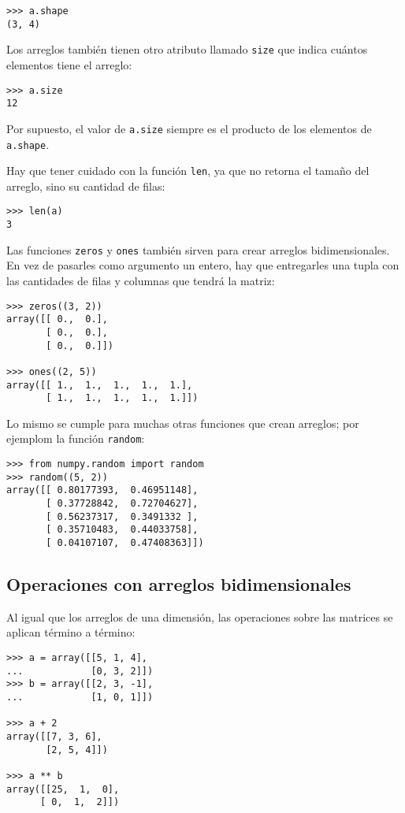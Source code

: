 \begin{lstlisting}
>>> a.shape
(3, 4)
\end{lstlisting}

Los arreglos también tienen otro atributo llamado \lstinline!size! que
indica cuántos elementos tiene el arreglo:

\begin{lstlisting}
>>> a.size
12
\end{lstlisting}

Por supuesto, el valor de \lstinline!a.size! siempre es el producto de
los elementos de \lstinline!a.shape!.

Hay que tener cuidado con la función \lstinline!len!, ya que no retorna
el tamaño del arreglo, sino su cantidad de filas:

\begin{lstlisting}
>>> len(a)
3
\end{lstlisting}

Las funciones \lstinline!zeros! y \lstinline!ones! también sirven para
crear arreglos bidimensionales. En vez de pasarles como argumento un
entero, hay que entregarles una tupla con las cantidades de filas y
columnas que tendrá la matriz:

\begin{lstlisting}
>>> zeros((3, 2))
array([[ 0.,  0.],
       [ 0.,  0.],
       [ 0.,  0.]])

>>> ones((2, 5))
array([[ 1.,  1.,  1.,  1.,  1.],
       [ 1.,  1.,  1.,  1.,  1.]])
\end{lstlisting}

Lo mismo se cumple para muchas otras funciones que crean arreglos; por
ejemplom la función \lstinline!random!:

\begin{lstlisting}
>>> from numpy.random import random
>>> random((5, 2))
array([[ 0.80177393,  0.46951148],
       [ 0.37728842,  0.72704627],
       [ 0.56237317,  0.3491332 ],
       [ 0.35710483,  0.44033758],
       [ 0.04107107,  0.47408363]])
\end{lstlisting}

\subsection{Operaciones con arreglos bidimensionales}

Al igual que los arreglos de una dimensión, las operaciones sobre las
matrices se aplican término a término:

\begin{lstlisting}
>>> a = array([[5, 1, 4],
...            [0, 3, 2]])
>>> b = array([[2, 3, -1],
...            [1, 0, 1]])

>>> a + 2
array([[7, 3, 6],
       [2, 5, 4]])

>>> a ** b
array([[25,  1,  0],
      [ 0,  1,  2]])
\end{lstlisting}

